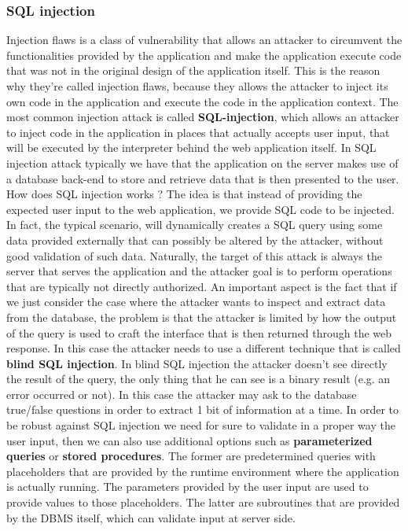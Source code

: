 \subsubsection{SQL injection}
Injection flaws is a class of vulnerability that allows an attacker to circumvent the functionalities provided by the application and make the application execute code that was not in the original design of the application itself. This is the reason why they're called injection flaws, because they allows the attacker to inject its own code in the application and execute the code in the application context. The most common injection attack is called \textbf{SQL-injection}, which allows an attacker to inject code in the application in places that actually accepts user input, that will be executed by the interpreter behind the web application itself. In SQL injection attack typically we have that the application on the server makes use of a database back-end to store and retrieve data that is then presented to the user. How does SQL injection works ? The idea is that instead of providing the expected user input to the web application, we provide SQL code to be injected. In fact, the typical scenario, will dynamically creates a SQL query using some data provided externally that can possibly be altered by the attacker, without good validation of such data. Naturally, the target of this attack is always the server that serves the application and the attacker goal is to perform operations that are typically not directly authorized. An important aspect is the fact that if we just consider the case where the attacker wants to inspect and extract data from the database, the problem is that the attacker is limited by how the output of the query is used to craft the interface that is then returned through the web response. In this case the attacker needs to use a different technique that is called \textbf{blind SQL injection}. In blind SQL injection the attacker doesn't see directly the result of the query, the only thing that he can see is a binary result (e.g. an error occurred or not). In this case the attacker may ask to the database true/false questions in order to extract 1 bit of information at a time. In order to be robust against SQL injection we need for sure to validate in a proper way the user input, then we can also use additional options such as \textbf{parameterized queries} or \textbf{stored procedures}. The former are predetermined queries with placeholders that are provided by the runtime environment where the application is actually running. The parameters provided by the user input are used to provide values to those placeholders. The latter are subroutines that are provided by the DBMS itself, which can validate input at server side.

